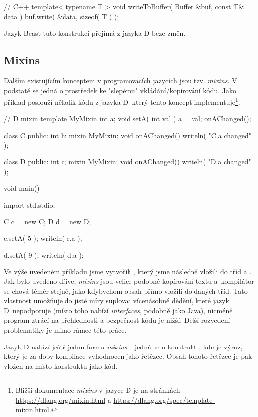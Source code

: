 \begin{cppcode}
// C++
template< typename T >
void writeToBuffer( Buffer &buf, const T& data ) {
	buf.write( &data, sizeof( T ) );
}
\end{cppcode}

Jazyk Beast tuto konstrukci přejímá z jazyka D beze změn.

\subsection{Mixins}
Dalším existujícím konceptem v programovacích jazycích jsou tzv. \textit{mixins}. V podstatě se jedná o prostředek ke "slepému" vkládání/kopírování kódu. Jako příklad poslouží několik kódu z jazyka D, který tento koncept implementuje\footnote{Bližší dokumentace \textit{mixins} v jazyce D je na stránkách \url{https://dlang.org/mixin.html} a \url{https://dlang.org/spec/template-mixin.html}.}.

\begin{dcode}
// D
mixin template MyMixin {
	int a;	
	void setA( int val ) {
		a = val;	
		onAChanged();
	}
}

class C {
public:
	int b;
	mixin MyMixin;
	void onAChanged() {
		writeln( "C.a changed" );	
	}
}

class D {
public:
	int c;
	mixin MyMixin;	
	void onAChanged() {
		writeln( "D.a changed" );	
	}
}

void main() {
	import std.stdio;
	
	C c = new C;
	D d = new D;
	
	c.setA( 5 );
	writeln( c.a );
	
	d.setA( 9 );
	writeln( d.a );
}
\end{dcode}

Ve výše uvedeném příkladu jsme vytvořili , který jsme následně vložili do tříd  a . Jak bylo uvedeno dříve, \textit{mixins} jsou velice podobné kopírování textu a~kompilátor se chová téměr stejně, jako kdybychom obsah  přímo vložili do daných tříd. Tato vlastnost umožňuje do jisté míry suplovat vícenásobné dědění, které jazyk D~nepodporuje (místo toho nabízí \textit{interfaces}, podobně jako Java), nicméně program ztrácí na přehlednosti a bezpečnost kódu je nižší. Delší rozvedení problematiky je mimo rámec této práce.

Jazyk D nabízí ještě jednu formu \textit{mixins} -- jedná se o konstrukt , kde  je výraz, který je za doby kompilace vyhodnocen jako řetězec. Obsah tohoto řetězce je pak vložen na místo konstruktu jako kód.

